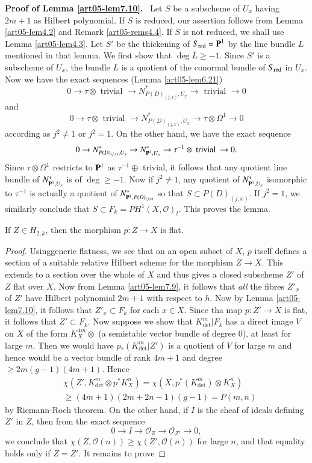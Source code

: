 \noindent
{\bf Proof of Lemma \ref{art05-lem7.10}.}~
Let $S$ be a subscheme of $U_{x}$ having $2m+1$ as Hilbert
polynomial. If $S$ is reduced, our assertion follows from
Lemma \ref{art05-lem4.2} and Remark \ref{art05-rems4.4}. If $S$ is not
reduced, we shall use Lemma \ref{art05-lem4.3}. Let $S'$ be the
thickening of $S_{\operatorname{red}}=\mathbf{P}^{1}$ by the line bundle $L$ mentioned in
that lemma. We first show that $\deg L\geq -1$. Since $S'$ is a
subscheme of $U_{x}$, the bundle $L$ is a quotient of the conormal
bundle of $S_{\operatorname{red}}$ in $U_{x}$. Now we have the exact sequences
(Lemma \ref{art05-lem6.21})
$$
0\to \tau\otimes \text{~trivial~}\to
N^{*}_{P(D)_{(j,x)},U_{x}}\to \text{~trivial~}\to 0
$$
and
$$
0\to \tau\otimes \text{~trivial~}\to
N^{*}_{P(D)_{(j,x)},U_{x}} \to \tau\otimes \Omega^{1}\to 0
$$
according as $j^{2}\neq 1$ or $j^{2}=1$. On the other hand, we have
the exact sequence
$$
0\to N^{*}_{P(D)_{(j,x)},U_{x}}\to
N^{*}_{\mathbf{P}^{1},U_{x}}\to \tau^{-1}\otimes \text{~trivial~}\to 0.
$$
Since $\tau\otimes \Omega^{1}$ restricts to $\mathbf{P}^{1}$ as
$\tau^{-1}\oplus$ trivial, it follows that any quotient line bundle of
$N^{*}_{\mathbf{P}^{1},U_{x}}$ is of $\deg \geq -1$. Now if $j^{2}\neq 1$,
any quotient of $N^{*}_{\mathbf{P}^{1},U_{x}}$ isomorphic to $\tau^{-1}$ is
actually a quotient of $N^{*}_{\mathbf{P}^{1},P(D)_{(j,x)}}$ so that
$S\subset P(D)_{(j,x)}$. If $j^{2}=1$, we similarly conclude that
$S\subset F_{k}=PH^{1}(X,\mathscr{O})_{t}$. This proves the lemma.

\begin{lemma}\label{art05-lem7.12}
If $Z\in H_{2,k}$, then the morphism $p:Z\to X$ is flat.
\end{lemma}

\begin{proof}
Using\pageoriginale generic flatness, we see that on an open subset of
$X$, $p$ itself defines a section of a suitable relative Hilbert
scheme for the morphism $Z\to X$. This extends to a section over the
whole of $X$ and thus gives a closed subscheme $Z'$ of $Z$ flat over
$X$. Now from Lemma \ref{art05-lem7.9}, it follows that {\em all} the
fibres $Z'_{x}$ of $Z'$ have Hilbert polynomial $2m+1$ with respect to
$h$. Now by Lemma \ref{art05-lem7.10}, it follows that $Z'_{x}\subset
F_{k}$ for each $x\in X$. Since tha map $p:Z'\to X$ is flat, it
follows that $Z'\subset F_{k}$. Now suppose we show that
$K^{m}_{\det}|F_{k}$ has a direct image $V$ on $X$ of the form
$K^{4m}_{X}\otimes$ (a semistable vector bundle of degree $0$), at
least for large $m$. Then we would have $p_{*}(K^{m}_{\det}|Z')$ is a
quotient of $V$ for large $m$ and hence would be a vector bundle of
rank $4m+1$ and degree $\geq 2m(g-1)(4m+1)$. Hence
\begin{align*}
& \chi(Z',K^{m}_{\det}\otimes
p^{*}K^{n}_{X})=\chi(X,p^{*}(K^{m}_{\det})\otimes K^{n}_{X})\\
& \geq (4m+1)(2m+2n-1)(g-1)=P(m,n)
\end{align*}
by Riemann-Roch theorem. On the other hand, if $I$ is the sheaf of
ideals defining $Z'$ in $Z$, then from the exact sequence
$$
0\to I\to \mathscr{O}_Z\to \mathscr{O}_{Z'}\to 0,
$$
we conclude that $\chi(Z,\mathscr{O}(n))\geq \chi(Z',\mathscr{O}(n))$
for large $n$, and that equality holds only if $Z=Z'$. It remains to
prove 
\end{proof}


